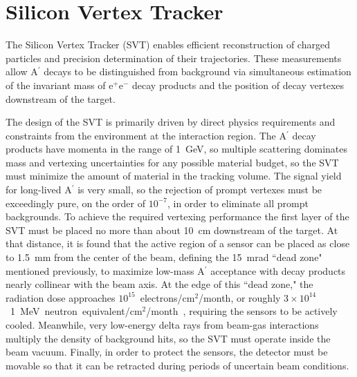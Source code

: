 \documentclass[final,3p,times,twocolumn]{elsarticle}
\newcommand{\Aprime}{A\ensuremath{^\prime}}
\newcommand{\ee}{e$^+$e$^-$}
\newcommand{\fluenceunit}{1~MeV~neutron~equivalent/cm\ensuremath{^2}}
\begin{document}

\section{Silicon Vertex Tracker}
\label{svt}

The Silicon Vertex Tracker (SVT) enables efficient reconstruction of charged particles and precision 
determination of their trajectories. These measurements allow \Aprime{} decays to be distinguished 
from background via simultaneous estimation of the invariant mass of \ee{} decay products and the 
position of decay vertexes downstream of the target. 

The design of the SVT is primarily driven by direct physics requirements and constraints from the 
environment at the interaction region. The \Aprime{} decay products 
have momenta in the range of 1~GeV, so multiple scattering dominates mass and vertexing 
uncertainties for any possible material budget, so the SVT must minimize the amount of 
material in the tracking volume. The signal yield for long-lived \Aprime{} is very small, so 
the rejection of prompt vertexes must be exceedingly pure, on the order of $10^{-7}$, in order to 
eliminate all prompt backgrounds. To achieve the required vertexing performance the first layer of the 
SVT must be placed no more than about 10~cm downstream of the target. At that distance, it is found 
that the active region of a sensor can be placed as close to 1.5~mm from the center of the beam, 
defining the 15~mrad ``dead zone" mentioned previously, to maximize low-mass \Aprime{} acceptance 
with decay products nearly collinear with the beam axis. At the edge of this ``dead zone," the 
radiation dose approaches $10^{15}$~electrons/cm$^2$/month, or roughly 
$3 \times 10^{14}$~\fluenceunit{}/month~\cite{Rashevskaya:2002nd}, 
requiring the sensors to be actively cooled.
Meanwhile, very low-energy delta rays from 
beam-gas interactions multiply the density of background hits, so the SVT must operate inside the 
beam vacuum.  Finally, in order to protect the sensors, the detector must be movable so that it can be 
retracted during periods of uncertain beam conditions.  
\end{document}
